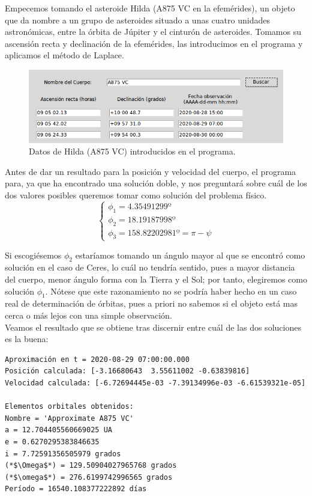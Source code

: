 \documentclass[11pt]{book}
\begin{document}
Empecemos tomando el asteroide Hilda (A875 VC en la efemérides), un objeto que da nombre a un grupo de asteroides situado a unas cuatro unidades astronómicas, entre la órbita de Júpiter y el cinturón de asteroides. Tomamos su ascensión recta y declinación de la efemérides, las introducimos en el programa y aplicamos el método de Laplace.\\

\begin{figure}[H]
\centering
\includegraphics[scale=0.5]{images/hilda_exp.png}
\caption{Datos de Hilda (A875 VC) introducidos en el programa.}
\label{fig:hilda_exp}
\end{figure}

Antes de dar un resultado para la posición y velocidad del cuerpo, el programa para, ya que ha encontrado una solución doble, y nos preguntará sobre cuál de los dos valores posibles queremos tomar como solución del problema físico.\\
\[
\left\{
\begin{array}{l}
\phi_1=4.35491299º\\
\phi_2=18.19187998º\\
\phi_3=158.82202981º=\pi-\psi
\end{array}
\right.
\]

Si escogiésemos $\phi_2$ estaríamos tomando un ángulo mayor al que se encontró como solución en el caso de Ceres, lo cuál no tendría sentido, pues a mayor distancia del cuerpo, menor ángulo forma con la Tierra y el Sol; por tanto, elegiremos como solución $\phi_1$. Nótese que este razonamiento no se podría haber hecho en un caso real de determinación de órbitas, pues a priori no sabemos si el objeto está mas cerca o más lejos con una simple observación.\\

Veamos el resultado que se obtiene tras discernir entre cuál de las dos soluciones es la buena:
\begin{lstlisting}[style=Console]
Aproximación en t = 2020-08-29 07:00:00.000
Posición calculada: [-3.16680643  3.55611002 -0.63839816]
Velocidad calculada: [-6.72694445e-03 -7.39134996e-03 -6.61539321e-05]

Elementos orbitales obtenidos:
Nombre = 'Approximate A875 VC'
a = 12.704405560669025 UA
e = 0.6270295383846635
i = 7.72591356505979 grados
(*$\Omega$*) = 129.50904027965768 grados
(*$\omega$*) = 276.6199742996565 grados
Período = 16540.108377222892 días
\end{lstlisting}
\end{document}
